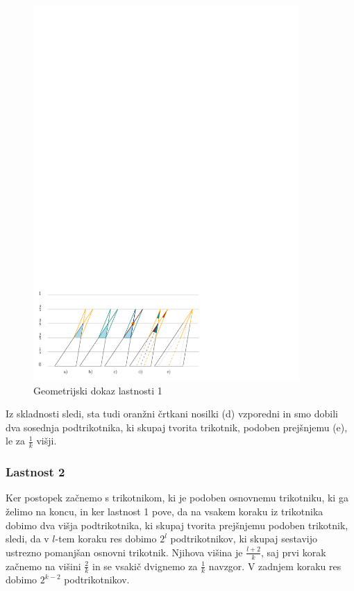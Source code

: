 \documentclass[a4paper, 12pt]{article}
\begin{document}
\begin{figure}[h!]
    \centering
    \includegraphics[width=0.9\textwidth]{ipe_slike/uhlji.pdf}
    \caption{Geometrijski dokaz lastnosti 1}
    \label{uhlji}
\end{figure}

Iz skladnosti sledi, sta tudi oranžni črtkani nosilki (d) vzporedni in smo dobili dva sosednja podtrikotnika, ki skupaj tvorita trikotnik, podoben prejšnjemu (e), le za $ \frac{1}{k} $ višji.


\subsubsection*{Lastnost 2}

Ker postopek začnemo s trikotnikom, ki je podoben osnovnemu trikotniku, ki ga želimo na koncu, in ker lastnost 1 pove, da na vsakem koraku iz trikotnika dobimo dva višja podtrikotnika, ki skupaj tvorita prejšnjemu podoben trikotnik, sledi, da v $ l $-tem koraku res dobimo $ 2^l $ podtrikotnikov, ki skupaj sestavijo ustrezno pomanjšan osnovni trikotnik. Njihova višina je $ \frac{l+2}{k} $, saj prvi korak začnemo na višini $ \frac{2}{k} $ in se vsakič dvignemo za $ \frac{1}{k} $ navzgor. V zadnjem koraku res dobimo $ 2^{k-2} $ podtrikotnikov.
\end{document}
